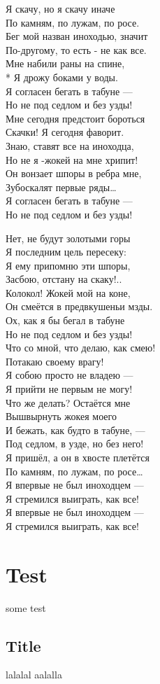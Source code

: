 \documentclass{memoir}
\newenvironment{mychapter}[1]
{ 
\section{#1}   
\huge 
}
{  }
\newenvironment{song}[1]
{ 
\subsection{#1}   
\huge 
}
{  }
\begin{document}
\begin{multicols*}{2}
\noindent
{\huge
Я скачу, но я скачу иначе\\
По камням, по лужам, по росе.\\
Бег мой назван иноходью, значит\\
По-другому, то есть - не как все.\\

\noindent
Мне набили раны на спине,\\*
Я дрожу боками у воды.\\
Я согласен бегать в табуне —\\
Но не под седлом и без узды!\\

\noindent
Мне сегодня предстоит бороться \\
Скачки! Я сегодня фаворит.\\
Знаю, ставят все на иноходца,\\
Но не я -жокей на мне хрипит!\\

\noindent
Он вонзает шпоры в ребра мне,\\
Зубоскалят первые ряды…\\
Я согласен бегать в табуне —\\
Но не под седлом и без узды!

\vfill\null
\columnbreak  

\noindent
Нет, не будут золотыми горы \\
Я последним цель пересеку:\\
Я ему припомню эти шпоры,\\
Засбою, отстану на скаку!..\\

\noindent
Колокол! Жокей мой на коне,\\
Он смеётся в предвкушеньи мзды.\\
Ох, как я бы бегал в табуне \\
Но не под седлом и без узды!\\

\noindent
Что со мной, что делаю, как смею!\\
Потакаю своему врагу!\\
Я собою просто не владею —\\
Я прийти не первым не могу!\\

\noindent
Что же делать? Остаётся мне\\
Вышвырнуть жокея моего\\
И бежать, как будто в табуне, —\\
Под седлом, в узде, но без него!\\

\noindent
Я пришёл, а он в хвосте плетётся\\
По камням, по лужам, по росе…\\
Я впервые не был иноходцем —\\
Я стремился выиграть, как все!\\

\noindent
Я впервые не был иноходцем —\\
Я стремился выиграть, как все!\\
}
\end{multicols*}

\clearpage

\begin{mychapter}{Test}
some test
\end{mychapter}
\begin{song}{Title}
lalalal
aalalla
\end{song}
\end{document}
